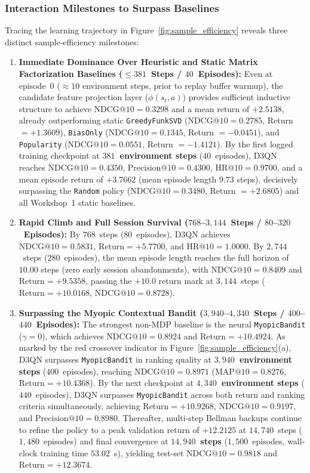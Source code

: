\subsubsection{Interaction Milestones to Surpass Baselines}
Tracing the learning trajectory in Figure~\ref{fig:sample_efficiency} reveals three distinct sample-efficiency milestones:
\begin{enumerate}
    \item \textbf{Immediate Dominance Over Heuristic and Static Matrix Factorization Baselines ($\le 381$~Steps / $40$~Episodes):} Even at episode~0 ($\approx 10$ environment steps, prior to replay buffer warmup), the candidate feature projection layer ($\phi(s_t, a)$) provides sufficient inductive structure to achieve $\text{NDCG@10} = 0.3298$ and a mean return of $+2.5138$, already outperforming static \texttt{GreedyFunkSVD} ($\text{NDCG@10} = 0.2785$, Return $= +1.3609$), \texttt{BiasOnly} ($\text{NDCG@10} = 0.1345$, Return $= -0.0451$), and \texttt{Popularity} ($\text{NDCG@10} = 0.0551$, Return $= -1.4121$). By the first logged training checkpoint at \textbf{$381$~environment steps} ($40$~episodes), D3QN reaches $\text{NDCG@10} = 0.4350$, $\text{Precision@10} = 0.4300$, $\text{HR@10} = 0.9700$, and a mean episode return of $+3.7662$ (mean episode length $9.73$ steps), decisively surpassing the \texttt{Random} policy ($\text{NDCG@10} = 0.3480$, Return $= +2.6805$) and all Workshop~1 static baselines.
    \item \textbf{Rapid Climb and Full Session Survival ($768$--$3,144$~Steps / $80$--$320$~Episodes):} By $768$~steps ($80$~episodes), D3QN achieves $\text{NDCG@10} = 0.5831$, $\text{Return} = +5.7700$, and $\text{HR@10} = 1.0000$. By $2,744$~steps ($280$~episodes), the mean episode length reaches the full horizon of $10.00$ steps (zero early session abandonments), with $\text{NDCG@10} = 0.8409$ and $\text{Return} = +9.5358$, passing the $+10.0$ return mark at $3,144$~steps ($\text{Return} = +10.0168$, $\text{NDCG@10} = 0.8728$).
    \item \textbf{Surpassing the Myopic Contextual Bandit ($3,940$--$4,340$~Steps / $400$--$440$~Episodes):} The strongest non-MDP baseline is the neural \texttt{MyopicBandit} ($\gamma=0$), which achieves $\text{NDCG@10} = 0.8924$ and $\text{Return} = +10.4924$. As marked by the red crossover indicator in Figure~\ref{fig:sample_efficiency}(a), D3QN surpasses \texttt{MyopicBandit} in ranking quality at \textbf{$3,940$~environment steps} ($400$~episodes), reaching $\text{NDCG@10} = 0.8971$ ($\text{MAP@10} = 0.8276$, $\text{Return} = +10.4368$). By the next checkpoint at \textbf{$4,340$~environment steps} ($440$~episodes), D3QN surpasses \texttt{MyopicBandit} across both return and ranking criteria simultaneously, achieving $\text{Return} = +10.9268$, $\text{NDCG@10} = 0.9197$, and $\text{Precision@10} = 0.8980$. Thereafter, multi-step Bellman backups continue to refine the policy to a peak validation return of $+12.2125$ at $14,740$~steps ($1,480$~episodes) and final convergence at \textbf{$14,940$~steps} ($1,500$~episodes, wall-clock training time $53.02$~s), yielding test-set $\text{NDCG@10} = 0.9818$ and $\text{Return} = +12.3674$.
\end{enumerate}

